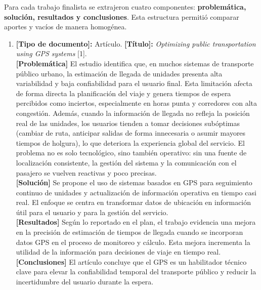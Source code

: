 Para cada trabajo finalista se extrajeron cuatro componentes: \textbf{problemática, solución, resultados y conclusiones}. Esta estructura permitió comparar aportes y vacíos de manera homogénea.

\begin{enumerate}
    \item \textbf{[Tipo de documento]:} Artículo. \textbf{[Título]:} \textit{Optimizing public transportation using GPS systems} [1].\\
    \textbf{[Problemática]} El estudio identifica que, en muchos sistemas de transporte público urbano, la estimación de llegada de unidades presenta alta variabilidad y baja confiabilidad para el usuario final. Esta limitación afecta de forma directa la planificación del viaje y genera tiempos de espera percibidos como inciertos, especialmente en horas punta y corredores con alta congestión. Además, cuando la información de llegada no refleja la posición real de las unidades, los usuarios tienden a tomar decisiones sub\'{o}ptimas (cambiar de ruta, anticipar salidas de forma innecesaria o asumir mayores tiempos de holgura), lo que deteriora la experiencia global del servicio. El problema no es solo tecnol\'{o}gico, sino tambi\'{e}n operativo: sin una fuente de localizaci\'{o}n consistente, la gesti\'{o}n del sistema y la comunicaci\'{o}n con el pasajero se vuelven reactivas y poco precisas.\\
    \textbf{[Solución]} Se propone el uso de sistemas basados en GPS para seguimiento continuo de unidades y actualización de información operativa en tiempo casi real. El enfoque se centra en transformar datos de ubicación en información útil para el usuario y para la gestión del servicio.\\
    \textbf{[Resultados]} Según lo reportado en el plan, el trabajo evidencia una mejora en la precisión de estimación de tiempos de llegada cuando se incorporan datos GPS en el proceso de monitoreo y cálculo. Esta mejora incrementa la utilidad de la información para decisiones de viaje en tiempo real.\\
    \textbf{[Conclusiones]} El artículo concluye que el GPS es un habilitador técnico clave para elevar la confiabilidad temporal del transporte público y reducir la incertidumbre del usuario durante la espera.


\end{enumerate}

